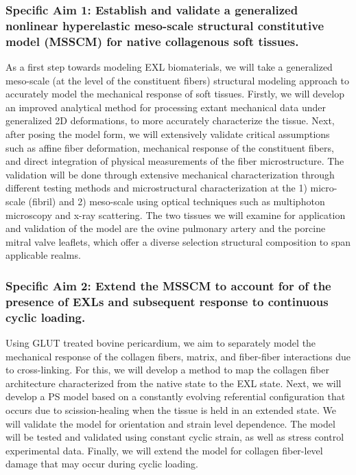     \subsubsection*{Specific Aim 1: Establish and validate a generalized nonlinear hyperelastic meso-scale structural constitutive model (MSSCM) for native collagenous soft tissues.} As a first step towards modeling EXL biomaterials, we will take a generalized meso-scale (at the level of the constituent fibers) structural modeling approach to accurately model the mechanical response of soft tissues. Firstly, we will develop an improved analytical method for processing extant mechanical data under generalized 2D deformations, to more accurately characterize the tissue. Next, after posing the model form, we will extensively validate critical assumptions such as affine fiber deformation, mechanical response of the constituent fibers, and direct integration of physical measurements of the fiber microstructure. The validation will be done through extensive mechanical characterization through different testing methods and microstructural characterization at the 1) micro-scale (fibril) and 2) meso-scale using optical techniques such as multiphoton microscopy and x-ray scattering. The two tissues we will examine for application and validation of the model are the ovine pulmonary artery and the porcine mitral valve leaflets, which offer a diverse selection structural composition to span applicable realms.
    


    \subsubsection*{Specific Aim 2: Extend the MSSCM to account for of the presence of EXLs and subsequent response to continuous cyclic loading.} Using GLUT treated bovine pericardium, we aim to separately model the mechanical response of the collagen fibers, matrix, and fiber-fiber interactions due to cross-linking. For this, we will develop a method to map the collagen fiber architecture characterized from the native state to the EXL state. Next, we will develop a PS model based on a constantly evolving referential configuration that occurs due to scission-healing when the tissue is held in an extended state. We will validate the model for orientation and strain level dependence. The model will be tested and validated using constant cyclic strain, as well as stress control experimental data. Finally, we will extend the model for collagen fiber-level damage that may occur during cyclic loading. 
    
